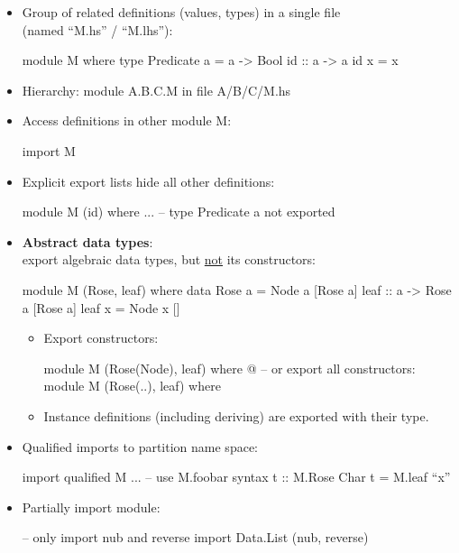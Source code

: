 \begin{itemize}
    \item Group of related definitions (values, types) in a single file \\ (named ``M.hs'' / ``M.lhs''):
    \begin{codebox}[haskell]
module M where
    type Predicate a = a -> Bool
    id :: a -> a
    id x = x
    \end{codebox}
    \item Hierarchy: module A.B.C.M in file A/B/C/M.hs
    \item Access definitions in other module M:
    \begin{codebox}[haskell]
import M
    \end{codebox}

    \newpage
    \item Explicit export lists hide all other definitions:
    \begin{codebox}[haskell]
module M (id) where
    ...
    -- type Predicate a not exported
    \end{codebox}
    \item \textbf{Abstract data types}:\\
    export algebraic data types, but \underline{not} its constructors:
        \begin{codebox}[haskell]
module M (Rose, leaf) where
    data Rose a = Node a [Rose a]
    leaf :: a -> Rose a [Rose a]
    leaf x = Node x []
        \end{codebox}
    \begin{itemize}
        \item Export constructors:
        \begin{codebox}[haskell]
module M (Rose(Node), leaf) where
    @\dots@
-- or export all constructors:
module M (Rose(..), leaf) where
        \end{codebox}
        \item Instance definitions (including deriving) are exported with their type.
    \end{itemize}
    \item Qualified imports to partition name space:
    \begin{codebox}[haskell]
import qualified M
    ...
    -- use M.foobar syntax
    t :: M.Rose Char
    t = M.leaf ``x''
    \end{codebox}
    \item Partially import module:
    \begin{codebox}[haskell]
-- only import nub and reverse
import Data.List (nub, reverse)


\end{codebox}
\end{itemize}
